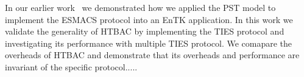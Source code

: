 	In our earlier work~\cite{dakka2017} we demonstrated how we applied the
PST model to implement the ESMACS protocol into an EnTK application. In this
work we validate the generality of HTBAC by implementing the TIES protocol and
investigating its performance with multiple TIES protocol. We comapare the
overheads of HTBAC and demonstrate that its overheads and performance are
invariant of the specific protocol..... 









